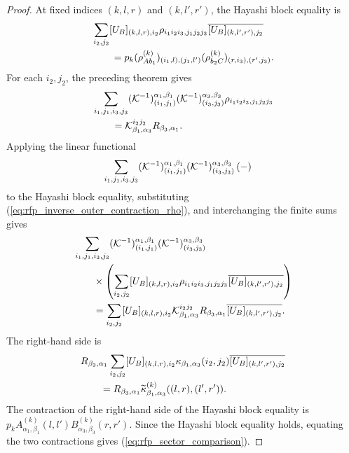 \begin{proof}
    \leanok
    At fixed indices $(k,l,r)$ and $(k,l',r')$, the Hayashi block equality is
    \begin{align}
         & \sum_{i_2,j_2}
        [U_B]_{(k,l,r),i_2}
        \rho_{i_1i_2i_3,j_1j_2j_3}
        \overline{[U_B]_{(k,l',r'),j_2}}
        \notag            \\
         & \qquad
        =p_k(\rho_{A b_1}^{(k)})_{(i_1,l),(j_1,l')}
        (\rho_{b_2 C}^{(k)})_{(r,i_3),(r',j_3)}.
        \notag
    \end{align}
    For each $i_2,j_2$, the preceding theorem gives
    \begin{align}
         & \sum_{i_1,j_1,i_3,j_3}
        (\mathcal K^{-1})^{\alpha_1,\beta_1}_{(i_1,j_1)}
        (\mathcal K^{-1})^{\alpha_3,\beta_3}_{(i_3,j_3)}
        \rho_{i_1i_2i_3,j_1j_2j_3}
        \notag                    \\
         & \qquad
        =\mathcal K^{i_2j_2}_{\beta_1,\alpha_3}
        R_{\beta_3,\alpha_1}.
        \label{eq:rfp_inverse_outer_contraction_rho}
    \end{align}
    Applying the linear functional
    \begin{align}
        \sum_{i_1,j_1,i_3,j_3}
         & (\mathcal K^{-1})^{\alpha_1,\beta_1}_{(i_1,j_1)}
        (\mathcal K^{-1})^{\alpha_3,\beta_3}_{(i_3,j_3)}\,(-)
        \notag
    \end{align}
    to the Hayashi block equality, substituting
    (\ref{eq:rfp_inverse_outer_contraction_rho}), and interchanging the finite
    sums gives
    \begin{align}
         & \sum_{i_1,j_1,i_3,j_3}
        (\mathcal K^{-1})^{\alpha_1,\beta_1}_{(i_1,j_1)}
        (\mathcal K^{-1})^{\alpha_3,\beta_3}_{(i_3,j_3)}
        \notag                                \\
         & \qquad{}\times\left(\sum_{i_2,j_2}
        [U_B]_{(k,l,r),i_2}
        \rho_{i_1i_2i_3,j_1j_2j_3}
        \overline{[U_B]_{(k,l',r'),j_2}}\right)
        \notag                                \\
         & \qquad
        =\sum_{i_2,j_2}
        [U_B]_{(k,l,r),i_2}
        \mathcal K^{i_2j_2}_{\beta_1,\alpha_3}
        R_{\beta_3,\alpha_1}
        \overline{[U_B]_{(k,l',r'),j_2}}.
        \notag
    \end{align}
    The right-hand side is
    \begin{align}
         & R_{\beta_3,\alpha_1}
        \sum_{i_2,j_2}
        [U_B]_{(k,l,r),i_2}
        \kappa_{\beta_1,\alpha_3}(i_2,j_2)
        \overline{[U_B]_{(k,l',r'),j_2}}
        \notag                  \\
         & \qquad
        =R_{\beta_3,\alpha_1}
        \widetilde\kappa^{(k)}_{\beta_1,\alpha_3}
        ((l,r),(l',r')).
        \notag
    \end{align}
    The contraction of the right-hand side of the Hayashi block equality is
    $p_k A^{(k)}_{\alpha_1,\beta_1}(l,l')
        B^{(k)}_{\alpha_3,\beta_3}(r,r')$.
    Since the Hayashi block equality holds, equating the two contractions
    gives (\ref{eq:rfp_sector_comparison}).
\end{proof}

